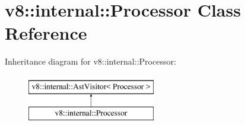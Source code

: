 \hypertarget{classv8_1_1internal_1_1Processor}{}\section{v8\+:\+:internal\+:\+:Processor Class Reference}
\label{classv8_1_1internal_1_1Processor}
Inheritance diagram for v8\+:\+:internal\+:\+:Processor\+:\begin{figure}[H]
\begin{center}
\leavevmode
\includegraphics[height=2.000000cm]{classv8_1_1internal_1_1Processor}
\end{center}
\end{figure}
